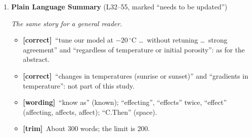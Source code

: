 \documentclass[11pt]{article}
\newcommand{\Pg}[3]{\item \textbf{#1} {\small(#2)}\par\textit{#3}}
\newcommand{\tC}{\textcolor{miss}{\textbf{[correct]}}\ }
\newcommand{\tG}{\textcolor{stale}{\textbf{[wording]}}\ }
\newcommand{\tT}{\textcolor{cut}{\textbf{[trim]}}\ }
\begin{document}
\begin{enumerate}
\begin{itemize}
    conductivity against SSA at every temperature within 0.3\%); result~2
    (SSA$^{-0.80}$ for $\varphi \le 0.375$, level set by porosity); meaning.
    At most 250 words (it is 254 now).
  \end{itemize}
\Pg{Plain Language Summary}{L32--55, marked ``needs to be updated''}{The same story for a general reader.}
  \begin{itemize}
  \item \tC ``tune our model at $-20\,^{\circ}$C \ldots\ without retuning
    \ldots\ strong agreement'' and ``regardless of temperature or initial
    porosity'': as for the abstract.
  \item \tC ``changes in temperatures (sunrise or sunset)'' and ``gradients
    in temperature'': not part of this study.
  \item \tG ``know as'' (known); ``effecting'', ``effects'' twice, ``effect''
    (affecting, affects, affect); ``C.Then'' (space).
  \item \tT About 300 words; the limit is 200.
  \end{itemize}
\end{enumerate}
\end{document}
